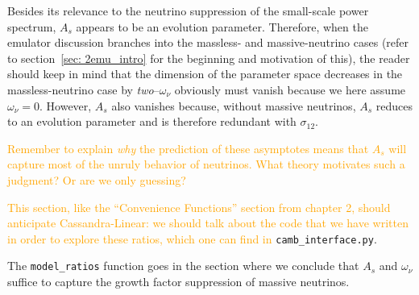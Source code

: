 Besides its relevance to the neutrino suppression of the small-scale power
spectrum, $A_s$ appears to be an evolution parameter. Therefore, when the
emulator discussion branches into the massless- and massive-neutrino cases
(refer to section~\ref{sec: 2emu_intro} for the beginning and motivation of
this), the reader should keep in mind that the dimension of the parameter
space decreases in the massless-neutrino case by \textit{two}--$\omega_\nu$ 
obviously must vanish because we here assume $\omega_\nu=0$. However, $A_s$
also vanishes because, without massive neutrinos, $A_s$ reduces to an
evolution parameter and is therefore redundant with $\sigma_{12}$.


\textcolor{orange}{Remember to explain \textit{why} the prediction of these 
asymptotes means that $A_s$ will capture most of the unruly behavior of 
neutrinos. What theory motivates such a judgment? Or are we only guessing?}

\textcolor{orange}{This section, like the ``Convenience Functions'' section
from chapter 2, should anticipate Cassandra-Linear: we should talk about the
code that we have written in order to explore these ratios, which one can find
in} \verb|camb_interface.py|.

The \verb|model_ratios| function goes in the section where we conclude that 
$A_s$ and $\omega_\nu$ suffice to capture the growth factor suppression of 
massive neutrinos.
